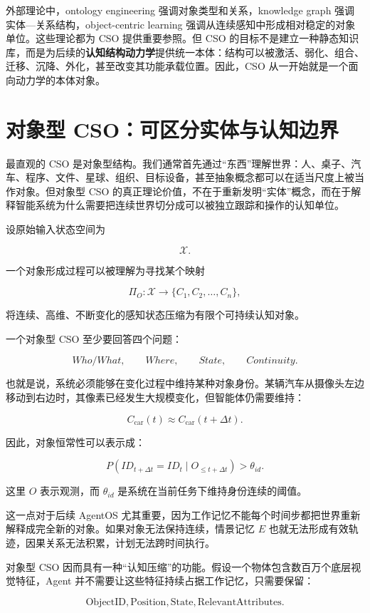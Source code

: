 外部理论中，ontology engineering 强调对象类型和关系，knowledge graph 强调实体—关系结构，object-centric learning 强调从连续感知中形成相对稳定的对象单位。这些理论都为 CSO 提供重要参照。但 CSO 的目标不是建立一种静态知识库，而是为后续的\textbf{认知结构动力学}提供统一本体：结构可以被激活、弱化、组合、迁移、沉降、外化，甚至改变其功能承载位置。因此，CSO 从一开始就是一个面向动力学的本体对象。


\section{对象型 CSO：可区分实体与认知边界}

最直观的 CSO 是对象型结构。我们通常首先通过“东西”理解世界：人、桌子、汽车、程序、文件、星球、组织、目标设备，甚至抽象概念都可以在适当尺度上被当作对象。但对象型 CSO 的真正理论价值，不在于重新发明“实体”概念，而在于解释智能系统为什么需要把连续世界切分成可以被独立跟踪和操作的认知单位。

设原始输入状态空间为

\[
\mathcal X.
\]

一个对象形成过程可以被理解为寻找某个映射

\[
\Pi_O:
\mathcal X
\rightarrow
\{C_1,C_2,\ldots,C_n\},
\]

将连续、高维、不断变化的感知状态压缩为有限个可持续认知对象。

一个对象型 CSO 至少要回答四个问题：

\[
Who/What,
\qquad
Where,
\qquad
State,
\qquad
Continuity.
\]

也就是说，系统必须能够在变化过程中维持某种对象身份。某辆汽车从摄像头左边移动到右边时，其像素已经发生大规模变化，但智能体仍需要维持：

\[
C_{\mathrm{car}}(t)
\approx
C_{\mathrm{car}}(t+\Delta t).
\]

因此，对象恒常性可以表示成：

\[
P
\left(
ID_{t+\Delta t}=ID_t
\mid
O_{\leq t+\Delta t}
\right)
>\theta_{id}.
\]

这里 \(O\) 表示观测，而 \(\theta_{id}\) 是系统在当前任务下维持身份连续的阈值。

这一点对于后续 AgentOS 尤其重要，因为工作记忆不能每个时间步都把世界重新解释成完全新的对象。如果对象无法保持连续，情景记忆 \(E\) 也就无法形成有效轨迹，因果关系无法积累，计划无法跨时间执行。

对象型 CSO 因而具有一种“认知压缩”的功能。假设一个物体包含数百万个底层视觉特征，Agent 并不需要让这些特征持续占据工作记忆，只需要保留：

\[
\mathrm{ObjectID},
\mathrm{Position},
\mathrm{State},
\mathrm{RelevantAttributes}.
\]

